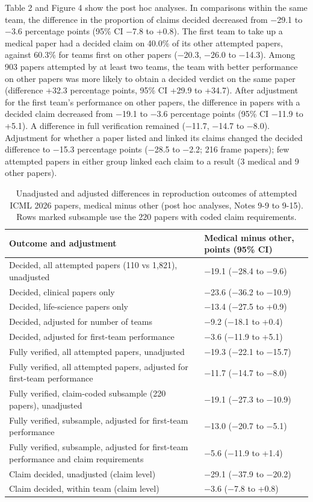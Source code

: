 \documentclass[11pt]{article}
\begin{document}
Table 2 and Figure 4 show the post hoc analyses. In comparisons within the same team, the difference in the proportion of claims decided decreased from −29.1 to −3.6 percentage points (95\% CI −7.8 to +0.8). The first team to take up a medical paper had a decided claim on 40.0\% of its other attempted papers, against 60.3\% for teams first on other papers (−20.3, −26.0 to −14.3). Among 903 papers attempted by at least two teams, the team with better performance on other papers was more likely to obtain a decided verdict on the same paper (difference +32.3 percentage points, 95\% CI +29.9 to +34.7). After adjustment for the first team's performance on other papers, the difference in papers with a decided claim decreased from −19.1 to −3.6 percentage points (95\% CI −11.9 to +5.1). A difference in full verification remained (−11.7, −14.7 to −8.0). Adjustment for whether a paper listed and linked its claims changed the decided difference to −15.3 percentage points (−28.5 to −2.2; 216 frame papers); few attempted papers in either group linked each claim to a result (3 medical and 9 other papers).

\begin{table}[htbp]
\centering\footnotesize
\renewcommand{\thetable}{2}
\caption{Unadjusted and adjusted differences in reproduction outcomes of attempted ICML 2026 papers, medical minus other (post hoc analyses, Notes 9-9 to 9-15). Rows marked subsample use the 220 papers with coded claim requirements.}\label{tab:table2}
\begin{tabularx}{\textwidth}{XL{3.6cm}}
\toprule
\textbf{Outcome and adjustment} & \textbf{Medical minus other, points (95\% CI)} \\ \midrule
Decided, all attempted papers (110 vs 1,821), unadjusted & −19.1 (−28.4 to −9.6) \\
Decided, clinical papers only & −23.6 (−36.2 to −10.9) \\
Decided, life-science papers only & −13.4 (−27.5 to +0.9) \\
Decided, adjusted for number of teams & −9.2 (−18.1 to +0.4) \\
Decided, adjusted for first-team performance & −3.6 (−11.9 to +5.1) \\
Fully verified, all attempted papers, unadjusted & −19.3 (−22.1 to −15.7) \\
Fully verified, all attempted papers, adjusted for first-team performance & −11.7 (−14.7 to −8.0) \\
Fully verified, claim-coded subsample (220 papers), unadjusted & −19.1 (−27.3 to −10.9) \\
Fully verified, subsample, adjusted for first-team performance & −13.0 (−20.7 to −5.1) \\
Fully verified, subsample, adjusted for first-team performance and claim requirements & −5.6 (−11.9 to +1.4) \\
Claim decided, unadjusted (claim level) & −29.1 (−37.9 to −20.2) \\
Claim decided, within team (claim level) & −3.6 (−7.8 to +0.8) \\
\bottomrule
\end{tabularx}
\end{table}
\end{document}
